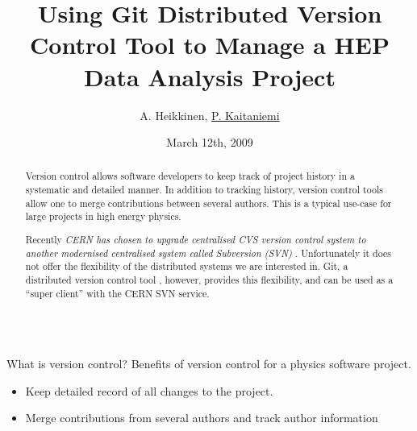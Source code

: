 \documentclass[final,hyperref={pdfpagelabels=false},notitlepage=true]{beamer}
\title[]{\Huge Using Git Distributed Version Control Tool to Manage a HEP Data Analysis Project}
\author{A. Heikkinen\inst{1}, \underline{P. Kaitaniemi\inst{1,2}}}
\institute[] %
{
  \inst{1}%
  Helsinki Institute of Physics P.O.Box 64 (Gustaf H\"allstr\"omin katu 2), FIN-00014 University of Helsinki, Finland
  \\
  \inst{2}%
  CEN-Saclay, CEA-IRFU/SPhN, 91 191 Gif sur Yvette, France
}
\date[March 12th, 2009]{March 12th, 2009}
\begin{document}
  \begin{frame}{} 
    \begin{center}
    \maketitle
    \end{center}
    \vfill
    \begin{abstract}
Version control allows software developers to keep track of project history in
a systematic and detailed manner. 
In addition to tracking history, version control tools allow
one to merge contributions between several authors.
This is a typical use-case for large projects in high energy physics.


\vspace{2cm}
Recently \emph{CERN has chosen to upgrade centralised CVS version control
system \cite{cernsvn} to another modernised centralised system called Subversion (SVN)} \cite{svnsite}.
Unfortunately it does not offer the flexibility of the
distributed systems we are interested in. 
Git, a distributed version control tool \cite{torvalds}, however, 
provides this flexibility, 
and can be used as a ``super client'' with the CERN SVN service.




    \end{abstract}
    \begin{columns}[t]
      \begin{column}{0.45\linewidth}

    \begin{block}{\large What is version control?}
      Benefits of version control for a physics software project.
      \begin{itemize}
        \item Keep detailed record of all changes to the project.
        \item Merge contributions from several authors and track author information
      \end{itemize}


\end{block}
\end{column}
\end{columns}
\end{frame}
\end{document}

